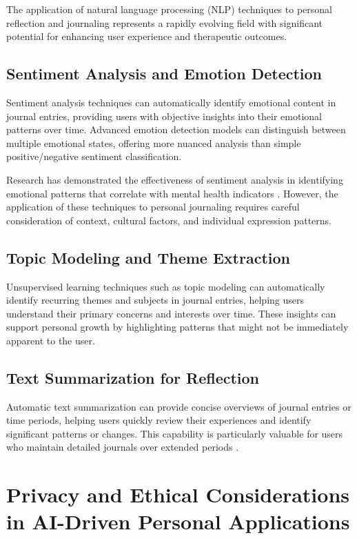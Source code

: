 The application of natural language processing (NLP) techniques to personal reflection and journaling represents a rapidly evolving field with significant potential for enhancing user experience and therapeutic outcomes.

\subsection{Sentiment Analysis and Emotion Detection}\label{subsec:sentiment}

Sentiment analysis techniques can automatically identify emotional content in journal entries, providing users with objective insights into their emotional patterns over time. Advanced emotion detection models can distinguish between multiple emotional states, offering more nuanced analysis than simple positive/negative sentiment classification.

Research has demonstrated the effectiveness of sentiment analysis in identifying emotional patterns that correlate with mental health indicators \cite{tausczik2010psychological}. However, the application of these techniques to personal journaling requires careful consideration of context, cultural factors, and individual expression patterns.

\subsection{Topic Modeling and Theme Extraction}\label{subsec:topic-modeling}

Unsupervised learning techniques such as topic modeling can automatically identify recurring themes and subjects in journal entries, helping users understand their primary concerns and interests over time. These insights can support personal growth by highlighting patterns that might not be immediately apparent to the user.

\subsection{Text Summarization for Reflection}\label{subsec:summarization}

Automatic text summarization can provide concise overviews of journal entries or time periods, helping users quickly review their experiences and identify significant patterns or changes. This capability is particularly valuable for users who maintain detailed journals over extended periods \cite{allahyari2017text}.

\section{Privacy and Ethical Considerations in AI-Driven Personal Applications}\label{sec:privacy-ethics}

